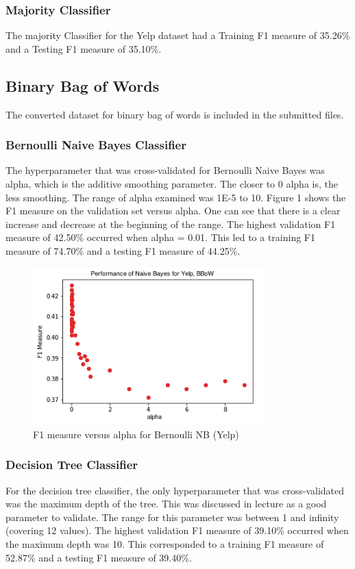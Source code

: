 \documentclass[11pt]{article}
\begin{document}
\subsubsection{Majority Classifier}
The majority Classifier for the Yelp dataset had a Training F1 measure of 35.26\% and a Testing F1 measure of 35.10\%.

\subsection{Binary Bag of Words}
The converted dataset for binary bag of words is included in the submitted files.

\subsubsection{Bernoulli Naive Bayes Classifier}
The hyperparameter that was cross-validated for Bernoulli Naive Bayes was alpha, which is the additive smoothing parameter. The closer to 0 alpha is, the less smoothing. The range of alpha examined was 1E-5 to 10. Figure 1 shows the F1 measure on the validation set versus alpha. One can see that there is a clear increase and decrease at the beginning of the range. The highest validation F1 measure of 42.50\% occurred when alpha = 0.01. This led to a training F1 measure of 74.70\% and a testing F1 measure of 44.25\%.

\begin{figure}[h]
\centering
\includegraphics[width=0.8\textwidth]{Yelp_BernoulliNB}
\caption{F1 measure versus alpha for Bernoulli NB (Yelp)}
\end{figure}

\subsubsection{Decision Tree Classifier}
For the decision tree classifier, the only hyperparameter that was cross-validated was the maximum depth of the tree. This was discussed in lecture as a good parameter to validate. The range for this parameter was between 1 and infinity (covering 12 values). The highest validation F1 measure of 39.10\% occurred when the maximum depth was 10. This corresponded to a training F1 measure of 52.87\% and a testing F1 measure of 39.40\%.
\end{document}
